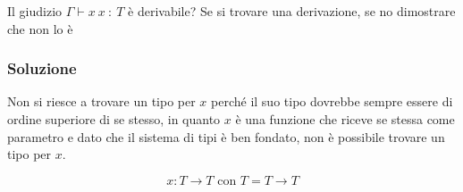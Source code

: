 Il giudizio $\Gamma \vdash x \: x \: :\: T$ è derivabile? Se si trovare una derivazione, se no dimostrare che non lo è

\subsubsection{Soluzione}

Non si riesce a trovare un tipo per $x$ perché il suo tipo dovrebbe sempre essere di ordine superiore di se stesso, in quanto $x$ è una funzione che riceve se stessa come parametro e dato che il sistema di tipi è ben fondato, non è possibile trovare un tipo per $x$.

$$
x : T \rightarrow T \text{ con } T = T \rightarrow T
$$